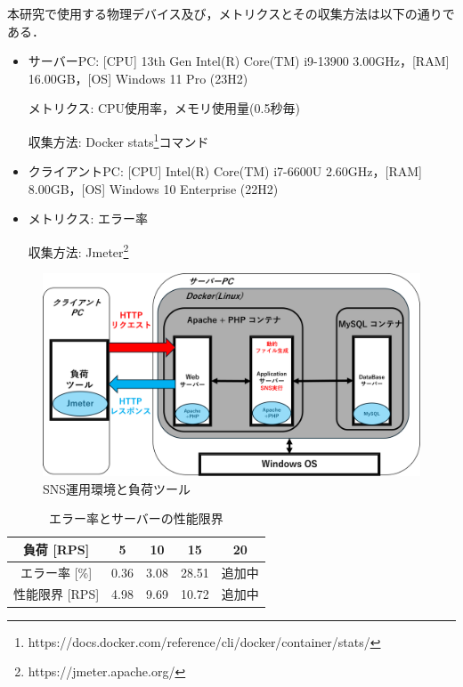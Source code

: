 \documentclass[twoside,twocolumn,10pt]{jarticle}  %
\begin{document}
本研究で使用する物理デバイス及び，メトリクスとその収集方法は以下の通りである．
\begin{itemize}
  \setlength{\parskip}{0cm} %
  \setlength{\itemsep}{0cm} %
  \item サーバーPC: [CPU] 13th Gen Intel(R) Core(TM) i9-13900 3.00GHz，[RAM] 16.00GB，[OS] Windows 11 Pro (23H2)\par
  メトリクス: CPU使用率，メモリ使用量(0.5秒毎)\par
  収集方法: Docker stats\footnote{https://docs.docker.com/reference/cli/docker/container/stats/}コマンド
  \item クライアントPC: [CPU] Intel(R) Core(TM) i7-6600U 2.60GHz，[RAM] 8.00GB，[OS] Windows 10 Enterprise (22H2)\par
  \item メトリクス: エラー率\par
  収集方法: Jmeter\footnote{https://jmeter.apache.org/}
\end{itemize}

\begin{figure}[t]
  \centering
  \includegraphics[scale=0.275]{figures/SNS_Docker.png}
  \vspace{-0.55cm}
  \caption{SNS運用環境と負荷ツール}
  \label{fig:1}
  \vspace{-0.15cm}
\end{figure}

\begin{table}[t]
  \vspace{-0.4cm}
  \centering
  \caption{エラー率とサーバーの性能限界}
  \label{tab:rps}
  \begin{tabular}{ccccc}
    \hline \hline
    負荷 [RPS] & 5 & 10 & 15 & 20 \\ \hline %
    エラー率 [\%] & 0.36 & 3.08 & 28.51 & 追加中 \\ \hline
    性能限界 [RPS] & 4.98 & 9.69 & 10.72 & 追加中 \\ \hline
  \end{tabular}
  \vspace{-0.3cm}
\end{table}
\end{document}
